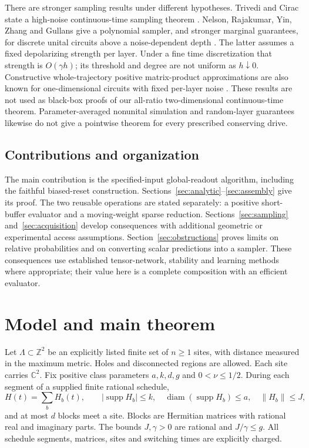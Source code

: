\documentclass[11pt,reqno]{amsart}
\numberwithin{equation}{section}
\theoremstyle{definition}
\theoremstyle{remark}
\newcommand{\supp}{\operatorname{supp}}
\newcommand{\diam}{\operatorname{diam}}
\newcommand{\C}{\mathbb C}
\newcommand{\Z}{\mathbb Z}
\newcommand{\nn}[1]{\lVert#1\rVert}
\newcommand{\abs}[1]{\lvert#1\rvert}
\begin{document}
There are stronger sampling results under different hypotheses. Trivedi and Cirac state a high-noise continuous-time sampling theorem \cite[Theorem~1]{TC}. Nelson, Rajakumar, Yin, Zhang and Gullans give a polynomial sampler, and stronger marginal guarantees, for discrete unital circuits above a noise-dependent depth \cite[Theorem~2.3 and Proposition~2.2]{NR}. The latter assumes a fixed depolarizing strength per layer. Under a fine time discretization that strength is $O(\gamma h)$; its threshold and degree are not uniform as $h\downarrow0$. Constructive whole-trajectory positive matrix-product approximations are also known for one-dimensional circuits with fixed per-layer noise \cite[Propositions~1 and~4]{Shao}. These results are not used as black-box proofs of our all-ratio two-dimensional continuous-time theorem. Parameter-averaged nonunital simulation \cite{Martinez} and random-layer guarantees \cite{AMRCH} likewise do not give a pointwise theorem for every prescribed conserving drive.

\subsection{Contributions and organization}
The main contribution is the specified-input global-readout algorithm, including the faithful biased-reset construction. Sections~\ref{sec:analytic}--\ref{sec:assembly} give its proof. The two reusable operations are stated separately: a positive short-buffer evaluator and a moving-weight sparse reduction. Sections~\ref{sec:sampling} and~\ref{sec:acquisition} develop consequences with additional geometric or experimental access assumptions. Section~\ref{sec:obstructions} proves limits on relative probabilities and on converting scalar predictions into a sampler. These consequences use established tensor-network, stability and learning methods where appropriate; their value here is a complete composition with an efficient evaluator.


\section{Model and main theorem}\label{sec:results}

Let $\Lambda\subset\Z^2$ be an explicitly listed finite set of $n\geq1$ sites, with distance measured in the maximum metric. Holes and disconnected regions are allowed. Each site carries $\C^2$. Fix positive class parameters $a,k,d,g$ and $0<\nu\leq1/2$. During each segment of a supplied finite rational schedule,
\begin{equation}\label{eq:H}
 H(t)=\sum_b H_b(t),\qquad
 \abs{\supp H_b}\leq k,\quad \diam(\supp H_b)\leq a,\quad
 \nn{H_b}\leq J,
\end{equation}
and at most $d$ blocks meet a site. Blocks are Hermitian matrices with rational real and imaginary parts. The bounds $J,\gamma>0$ are rational and $J/\gamma\leq g$. All schedule segments, matrices, sites and switching times are explicitly charged.
\end{document}
